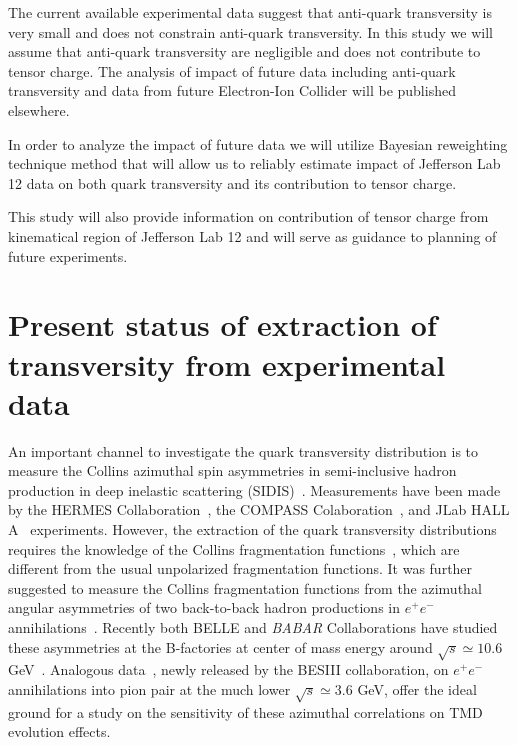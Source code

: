 \documentclass[twocolumn,showpacs,preprintnumbers,amsmath,amssymb,floatfix,prd]{revtex4}
\begin{document}
The current available experimental data suggest that anti-quark transversity is very small and does not constrain anti-quark transversity. In this study we will assume that anti-quark transversity are negligible and does not contribute to tensor charge. The analysis of impact of future data including anti-quark transversity and data from future Electron-Ion Collider will be published elsewhere.

In order to analyze the impact of future data we will utilize Bayesian reweighting technique method \cite{Sato:2013ika} that will allow us to reliably estimate impact of Jefferson Lab 12 data on both quark transversity and its contribution to tensor charge.

This study will also provide information on contribution of tensor charge from kinematical region of Jefferson Lab 12 and will serve as   guidance to planning of future experiments.

\section{Present status of extraction of transversity from experimental data }
An important channel to investigate the quark transversity distribution is to measure the
Collins azimuthal spin asymmetries in semi-inclusive hadron
production in deep inelastic scattering (SIDIS)~\cite{Collins:1992kk}. 
Measurements have been made by the HERMES Collaboration~\cite{Airapetian:2004tw,Airapetian:2010ds}, the COMPASS Colaboration~\cite{Adolph:2012sn}, 
and JLab HALL A~\cite{Qian:2011py} experiments.
However, the extraction of the quark transversity distributions requires
the knowledge of the Collins fragmentation functions~\cite{Collins:1992kk}, which
are different from the usual unpolarized fragmentation functions. It was further
suggested to measure the Collins fragmentation functions from the 
azimuthal angular asymmetries of two back-to-back hadron productions in $e^+e^-$ annihilations~\cite{Boer:1997mf}. 
Recently both BELLE and {\em BABAR} Collaborations have studied these
asymmetries at the B-factories at center of mass energy around
$\sqrt{s}\simeq 10.6$ GeV~\cite{Abe:2005zx,Seidl:2008xc,Garzia:2012za}.
Analogous data~\cite{Ablikim:2015sma}, newly released by the BESIII collaboration, on $e^+e^-$ annihilations into pion pair at the much lower $\sqrt{s}\simeq 3.6$ GeV, offer the ideal ground for a study on the sensitivity of these azimuthal correlations on TMD evolution effects.
\end{document}
